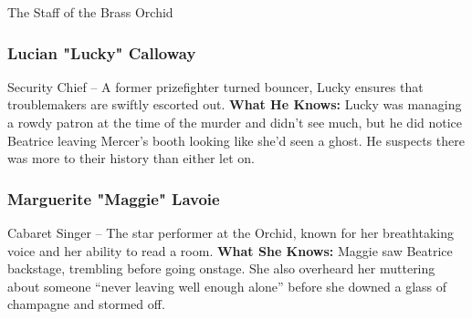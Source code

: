 \begin{WyrdFullNPC}[%
		name=The Staff of the Brass Orchid,%
		description=The people who keep the Orchid running,%
		float=!t%
	]{The Staff of the Brass Orchid}
	\subsubsection*{Lucian "Lucky" Calloway}
	Security Chief – A former prizefighter turned bouncer, Lucky ensures that troublemakers are swiftly escorted out.
	\textbf{What He Knows:} Lucky was managing a rowdy patron at the time of the murder and didn't see much, but he did notice Beatrice leaving Mercer’s booth looking like she'd seen a ghost. He suspects there was more to their history than either let on.

	\subsubsection*{Marguerite "Maggie" Lavoie} 
	Cabaret Singer – The star performer at the Orchid, known for her breathtaking voice and her ability to read a room.
	\textbf{What She Knows:} Maggie saw Beatrice backstage, trembling before going onstage. She also overheard her muttering about someone “never leaving well enough alone” before she downed a glass of champagne and stormed off.
\end{WyrdFullNPC}